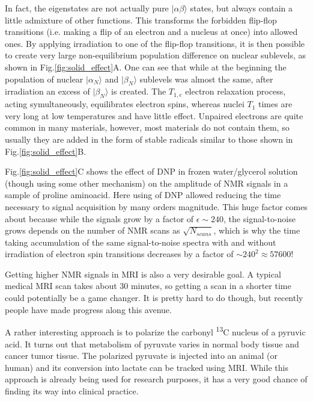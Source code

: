 \documentclass[a4paper, 12pt]{article}
\begin{document}
  In fact, the eigenstates are not actually pure $\vert \alpha \beta \rangle$  states, but always contain a little admixture of other functions. This transforms the forbidden flip-flop transitions (i.e. making a flip of an electron and a nucleus at once) into allowed ones. By applying  irradiation to one of the flip-flop transitions, it is then possible to create very large non-equilibrium population difference on nuclear sublevels, as shown in Fig.\ref{fig:solid_effect}A. One can see that while at the beginning the population of nuclear $\vert \alpha_N \rangle$ and $\vert \beta_N \rangle$ sublevels was almost the same, after irradiation an excess of $\vert \beta_N \rangle$ is created. The $T_{1,e}$ electron relaxation process, acting symultaneously, equilibrates electron spins, whereas nuclei $T_1$ times are very long at low temperatures and have little effect. Unpaired electrons are quite common in many materials, however, most materials do not contain them, so usually they are added in the form of stable radicals similar to those shown in Fig.\ref{fig:solid_effect}B.
 
  Fig.\ref{fig:solid_effect}C shows the effect of DNP in frozen water/glycerol solution (though using some other mechanism) on the amplitude of NMR signals in a  sample of proline aminoacid. Here using of DNP allowed reducing the time necessary to signal acquisition by many orders magnitude. This huge factor comes about because while the signals grow by a factor of $\epsilon \sim 240$, the signal-to-noise grows depends on the number of NMR scans as $\sqrt{N_{scans}}$, which is why the time taking accumulation of the same signal-to-noise spectra with and without irradiation of electron spin transitions decreases by a factor of $\sim 240^{2} \approx 57600$!
  
  Getting higher NMR signals in MRI is also a very desirable goal. A typical medical MRI scan takes about 30 minutes, so getting a scan in a shorter time could potentially be a game changer. It is pretty hard to do though, but recently people have made progress along this avenue.
  
  A rather interesting approach is to polarize the carbonyl \textsuperscript{13}C nucleus of a pyruvic acid. It turns out that metabolism of pyruvate varies in normal body tissue and cancer tumor tissue. The polarized pyruvate is injected into an animal (or human) and its conversion into lactate can be tracked using MRI. While this approach is already being used for research purposes, it has a very good chance of finding its way into clinical practice.
  
\end{document}
